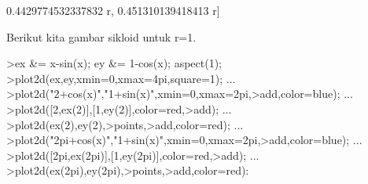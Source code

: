 \documentclass[a4paper,10pt]{article}
\begin{document}
\begin{eulernotebook}
\begin{eulercomment}
\begin{eulercomment}
\begin{eulercomment}
\begin{eulercomment}
\begin{eulercomment}
\begin{eulercomment}
\begin{eulercomment}
\begin{eulercomment}
\begin{eulercomment}
\begin{eulercomment}
\begin{eulercomment}
\begin{eulercomment}
\begin{eulercomment}
\begin{eulercomment}
\begin{eulercomment}
\begin{eulercomment}
\begin{eulercomment}
\begin{eulercomment}
\begin{euleroutput}
  0.4429774532337832 r, 0.451310139418413 r]
  
\end{euleroutput}
\begin{eulercomment}
Berikut kita gambar sikloid untuk r=1.
\end{eulercomment}
\begin{eulerprompt}
>ex &= x-sin(x); ey &= 1-cos(x); aspect(1);
>plot2d(ex,ey,xmin=0,xmax=4pi,square=1); ...
>plot2d("2+cos(x)","1+sin(x)",xmin=0,xmax=2pi,>add,color=blue); ...
>plot2d([2,ex(2)],[1,ey(2)],color=red,>add); ...
>plot2d(ex(2),ey(2),>points,>add,color=red); ...
>plot2d("2pi+cos(x)","1+sin(x)",xmin=0,xmax=2pi,>add,color=blue); ...
>plot2d([2pi,ex(2pi)],[1,ey(2pi)],color=red,>add); ...
>plot2d(ex(2pi),ey(2pi),>points,>add,color=red):
\end{eulerprompt}
\begin{euleroutput}

\end{euleroutput}
\end{eulercomment}
\end{eulercomment}
\end{eulercomment}
\end{eulercomment}
\end{eulercomment}
\end{eulercomment}
\end{eulercomment}
\end{eulercomment}
\end{eulercomment}
\end{eulercomment}
\end{eulercomment}
\end{eulercomment}
\end{eulercomment}
\end{eulercomment}
\end{eulercomment}
\end{eulercomment}
\end{eulercomment}
\end{eulercomment}
\end{eulernotebook}
\end{document}
